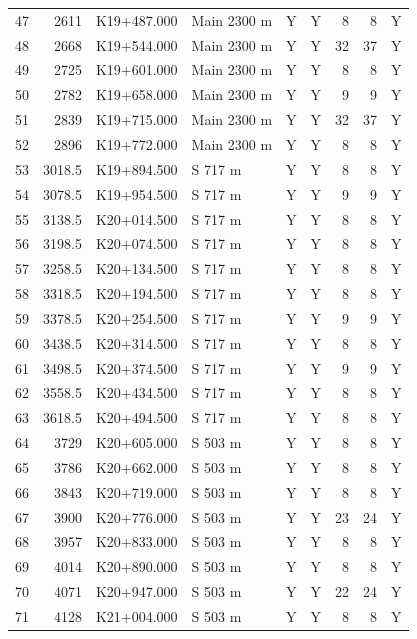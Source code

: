 \begin{longtable}{rrllccrrc}
47 & 2611 & K19+487.000 & Main 2300 m & Y & Y & 8 & 8 & Y \\
48 & 2668 & K19+544.000 & Main 2300 m & Y & Y & 32 & 37 & Y \\
49 & 2725 & K19+601.000 & Main 2300 m & Y & Y & 8 & 8 & Y \\
50 & 2782 & K19+658.000 & Main 2300 m & Y & Y & 9 & 9 & Y \\
51 & 2839 & K19+715.000 & Main 2300 m & Y & Y & 32 & 37 & Y \\
52 & 2896 & K19+772.000 & Main 2300 m & Y & Y & 8 & 8 & Y \\
53 & 3018.5 & K19+894.500 & S 717 m & Y & Y & 8 & 8 & Y \\
54 & 3078.5 & K19+954.500 & S 717 m & Y & Y & 9 & 9 & Y \\
55 & 3138.5 & K20+014.500 & S 717 m & Y & Y & 8 & 8 & Y \\
56 & 3198.5 & K20+074.500 & S 717 m & Y & Y & 8 & 8 & Y \\
57 & 3258.5 & K20+134.500 & S 717 m & Y & Y & 8 & 8 & Y \\
58 & 3318.5 & K20+194.500 & S 717 m & Y & Y & 8 & 8 & Y \\
59 & 3378.5 & K20+254.500 & S 717 m & Y & Y & 9 & 9 & Y \\
60 & 3438.5 & K20+314.500 & S 717 m & Y & Y & 8 & 8 & Y \\
61 & 3498.5 & K20+374.500 & S 717 m & Y & Y & 9 & 9 & Y \\
62 & 3558.5 & K20+434.500 & S 717 m & Y & Y & 8 & 8 & Y \\
63 & 3618.5 & K20+494.500 & S 717 m & Y & Y & 8 & 8 & Y \\
64 & 3729 & K20+605.000 & S 503 m & Y & Y & 8 & 8 & Y \\
65 & 3786 & K20+662.000 & S 503 m & Y & Y & 8 & 8 & Y \\
66 & 3843 & K20+719.000 & S 503 m & Y & Y & 8 & 8 & Y \\
67 & 3900 & K20+776.000 & S 503 m & Y & Y & 23 & 24 & Y \\
68 & 3957 & K20+833.000 & S 503 m & Y & Y & 8 & 8 & Y \\
69 & 4014 & K20+890.000 & S 503 m & Y & Y & 8 & 8 & Y \\
70 & 4071 & K20+947.000 & S 503 m & Y & Y & 22 & 24 & Y \\
71 & 4128 & K21+004.000 & S 503 m & Y & Y & 8 & 8 & Y \\
\end{longtable}
